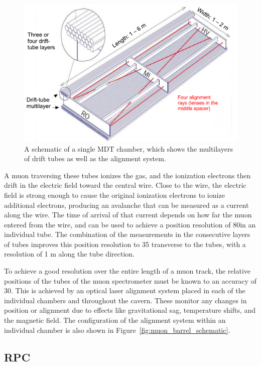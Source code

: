 \begin{figure}[hbtp]
\includegraphics[width=\fullfig]{figures/mdt_schematic.pdf}
\caption{A schematic of a single \ac{MDT} chamber, which shows the multilayers of drift tubes as well as the alignment system.}
\label{fig:mdt_schematic}
\end{figure}

A muon traversing these tubes ionizes the gas, and the ionization electrons then drift in the electric field toward the central wire.
Close to the wire, the electric field is strong enough to cause the original ionization electrons to ionize additional electrons, producing an avalanche that can be measured as a current along the wire. 
The time of arrival of that current depends on how far the muon entered from the wire, and can be used to achieve a position resolution of 80\um in an individual tube.
The combination of the measurements in the consecutive layers of tubes improves this position resolution to 35 \um transverse to the tubes, with a resolution of 1 m along the tube direction.

To achieve a good resolution over the entire length of a muon track, the relative positions of the tubes of the muon spectrometer must be known to an accuracy of 30\um. 
This is achieved by an optical laser alignment system placed in each of the individual chambers and throughout the cavern.
These monitor any changes in position or alignment due to effects like gravitational sag, temperature shifts, and the magnetic field.
The configuration of the alignment system within an individual chamber is also shown in Figure~\ref{fig:muon_barrel_schematic}.

\subsection{\acl{RPC}}

